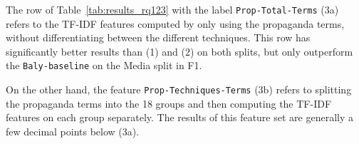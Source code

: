 
The row of Table~\ref{tab:results_rq123} with the label \texttt{Prop-Total-Terms} (3a) refers to the TF-IDF features computed by only using the propaganda terms, without differentiating between the different techniques.
This row has significantly better results than (1) and (2) on both splits, but only outperform the \texttt{Baly-baseline}  on the Media split in F1. %

On the other hand, the feature \texttt{Prop-Techniques-Terms} (3b) refers to splitting the propaganda terms into the 18 groups and then computing the TF-IDF features on each group separately. The results of this feature set are generally a few decimal points below (3a).





